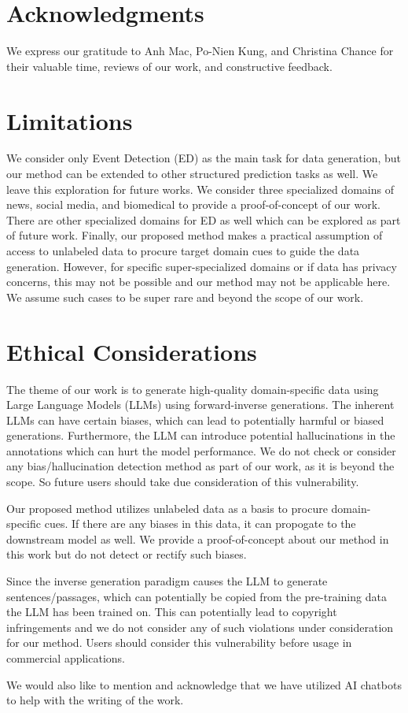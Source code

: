 \section*{Acknowledgments}

We express our gratitude to Anh Mac, Po-Nien Kung, and Christina Chance for their valuable time, reviews of our work, and constructive feedback.

\section*{Limitations}

We consider only Event Detection (ED) as the main task for data generation, but our method can be extended to other structured prediction tasks as well.
We leave this exploration for future works.
We consider three specialized domains of news, social media, and biomedical to provide a proof-of-concept of our work.
There are other specialized domains for ED as well which can be explored as part of future work.
Finally, our proposed method \modelName{} makes a practical assumption of access to unlabeled data to procure target domain cues to guide the data generation.
However, for specific super-specialized domains or if data has privacy concerns, this may not be possible and our method may not be applicable here.
We assume such cases to be super rare and beyond the scope of our work.

\section*{Ethical Considerations}

The theme of our work is to generate high-quality domain-specific data using Large Language Models (LLMs) using forward-inverse generations.
The inherent LLMs can have certain biases, which can lead to potentially harmful or biased generations.
Furthermore, the LLM can introduce potential hallucinations in the annotations which can hurt the model performance.
We do not check or consider any bias/hallucination detection method as part of our work, as it is beyond the scope.
So future users should take due consideration of this vulnerability.

Our proposed method \modelName{} utilizes unlabeled data as a basis to procure domain-specific cues.
If there are any biases in this data, it can propogate to the downstream model as well.
We provide a proof-of-concept about our method in this work but do not detect or rectify such biases.

Since the inverse generation paradigm causes the LLM to generate sentences/passages, which can potentially be copied from the pre-training data the LLM has been trained on.
This can potentially lead to copyright infringements and we do not consider any of such violations under consideration for our method.
Users should consider this vulnerability before usage in commercial applications.

We would also like to mention and acknowledge that we have utilized AI chatbots to help with the writing of the work.
